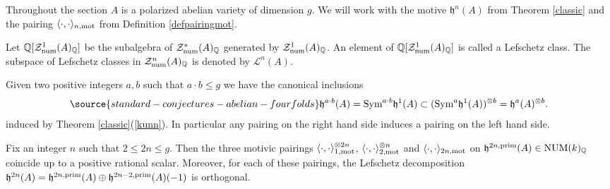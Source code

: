 Throughout the section $A$ is a polarized abelian variety of dimension $g$. We will work with the motive $\mathfrak{h}^{n}(A)$ from Theorem \ref{classic} and the pairing  $\langle \cdot, \cdot \rangle_{n,\mathrm{mot}} $   from Definition \ref{defpairingmot}.
\begin{definition}
\notready\label{defexotic} Let  $\mathbb{Q}[\mathcal{Z}^{1}_{\mathrm{num}}(A)_{\mathbb{Q}}]$ be the subalgebra of $\mathcal{Z}^{*}_{\mathrm{num}}(A)_{\mathbb{Q}}$ generated by $\mathcal{Z}^{1}_{\mathrm{num}}(A)_{\mathbb{Q}}$.  An element of $\mathbb{Q}[\mathcal{Z}^{1}_{\mathrm{num}}(A)_{\mathbb{Q}}]$ is called a  Lefschetz class. The subspace  of Lefschetz classes in $\mathcal{Z}^{n}_{\mathrm{num}}(A)_{\mathbb{Q}}$ is denoted by  $\mathcal{L}^{n}(A)$.
\end{definition}
\begin{remark}
\notready\label{nonsisa}
Given two positive integers $a,b$ such that $a\cdot b \leq g$ we have the canonical inclusions
\begin{equation} \label{eq:nonsisa}
\source{standard-conjectures-abelian-fourfolds}
\mathfrak{h}^{a\cdot b}(A)=\Sym^{a \cdot b} \mathfrak{h}^1(A) \subset (\Sym^{a} \mathfrak{h}^1(A))^{\otimes b}  = \mathfrak{h}^a(A)^{\otimes b}.
\end{equation}
  induced by Theorem \ref{classic}(\ref{kunn}). In particular any pairing on the right hand side induces a pairing on the left hand side. \end{remark}
\begin{lemma}
\notready\label{accoppiamenti1}
Fix an integer $n$ such that   $ 2 \leq 2n\leq g.$ Then the three motivic pairings $\langle \cdot, \cdot \rangle_{1,\mathrm{mot}}^{\otimes 2n}$,  $\langle \cdot, \cdot \rangle_{2,\mathrm{mot}}^{\otimes n}$ and $\langle \cdot, \cdot \rangle_{2n,\mathrm{mot}}$ on $\mathfrak{h}^{2n,\mathrm{prim}}(A)\in \mathrm{NUM}(k)_{\mathbb{Q}}$ coincide up to a positive rational scalar. Moreover, for each of these pairings, the Lefschetz decomposition $\mathfrak{h}^{2n}(A) = \mathfrak{h}^{2n,\mathrm{prim}}(A) \oplus \mathfrak{h}^{2n-2,\mathrm{prim}}(A) (-1)$ is orthogonal.\end{lemma}


